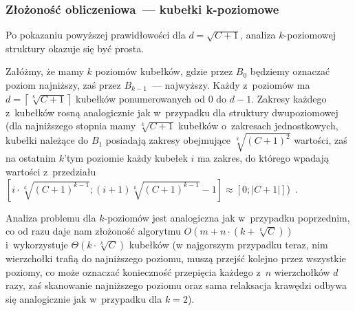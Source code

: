 \subsubsection{Złożoność obliczeniowa~--- kubełki k-poziomowe}


Po pokazaniu powyższej prawidłowości dla $d = \sqrt{C+1}$, analiza $k$-poziomowej struktury okazuje się być prosta.

Załóżmy, że mamy $k$ poziomów kubełków, gdzie przez $B_{0}$ będziemy oznaczać poziom najniższy, zaś przez $B_{k-1}$~--- najwyższy.
Każdy z~poziomów ma $d = \left\lceil \sqrt[k]{C+1} \right\rceil$ kubełków ponumerowanych od $0$ do $d-1$.
Zakresy każdego z~kubełków rosną analogicznie jak w~przypadku dla struktury dwupoziomowej (dla najniższego stopnia mamy $\sqrt[k]{C+1}$ kubełków o~zakresach jednostkowych, kubełki należące do $B_{1}$ posiadają zakresy obejmujące $\sqrt[k]{\left( C+1 \right) ^{2}}$ wartości, zaś na ostatnim $k$'tym poziomie każdy kubełek $i$ ma zakres, do którego wpadają wartości z~przedziału $\left[ i \cdot \sqrt[k]{\left( C+1 \right) ^{k-1}} ; \left( i + 1 \right) \sqrt[k]{\left( C+1 \right) ^{k-1}} - 1 \right] \approx \left[ 0 ; \left| C+1 \right| \right]$)~\cite[$4.1$--$4.3$]{NetOpt}.

Analiza problemu dla $k$-poziomów jest analogiczna jak w~przypadku poprzednim, co od razu daje nam złożoność algorytmu $O\left( m + n \cdot \left( k + \sqrt[k]{C} \right) \right)$ i~wykorzystuje $\Theta \left( k \cdot \sqrt[k]{C} \right)$ kubełków (w najgorszym przypadku teraz, nim wierzchołki trafią do najniższego poziomu, muszą przejść kolejno przez wszystkie poziomy, co może oznaczać konieczność przepięcia każdego z~$n$ wierzchołków $d$ razy, zaś skanowanie najniższego poziomu oraz sama relaksacja krawędzi odbywa się analogicznie jak w~przypadku dla $k=2$).

